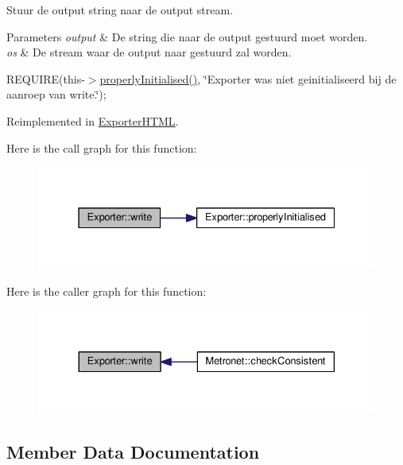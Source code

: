 Stuur de output string naar de output stream. 


\begin{DoxyParams}{Parameters}
{\em output} & De string die naar de output gestuurd moet worden. \\
\hline
{\em os} & De stream waar de output naar gestuurd zal worden.\\
\hline
\end{DoxyParams}
R\+E\+Q\+U\+I\+RE(this-\/$>$\hyperlink{class_exporter_aafd9df9210aeefd7bb7fd434fc317cf0}{properly\+Initialised()}, \char`\"{}\+Exporter was niet geinitialiseerd bij de aanroep van write.\char`\"{});~\newline


Reimplemented in \hyperlink{class_exporter_h_t_m_l_ace2649c240282289d4cb3bfbd19e427c}{Exporter\+H\+T\+ML}.

Here is the call graph for this function\+:
\nopagebreak
\begin{figure}[H]
\begin{center}
\leavevmode
\includegraphics[width=331pt]{class_exporter_ab3736803133eb727cf87a7306f91eb11_cgraph}
\end{center}
\end{figure}
Here is the caller graph for this function\+:
\nopagebreak
\begin{figure}[H]
\begin{center}
\leavevmode
\includegraphics[width=330pt]{class_exporter_ab3736803133eb727cf87a7306f91eb11_icgraph}
\end{center}
\end{figure}


\subsection{Member Data Documentation}
\mbox{\label{class_exporter_a7d55f6023d5fe983512f6b02fb60733b}} 
